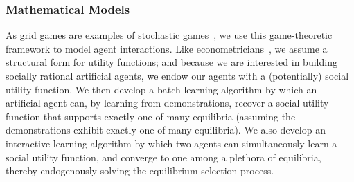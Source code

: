 
\subsubsection*{\large Mathematical Models}
\label{sec:models}

As grid games are examples of stochastic
games~\cite{Fink64,Shapley53}, we use this game-theoretic
framework to model agent interactions.
%
Like econometricians~\cite{RePEc:eee:ecochp:6a-64}, we assume a
structural form for utility functions; and because we are interested
in building socially rational artificial agents, we endow our agents
with a (potentially) social utility function.
%
We then develop a batch learning algorithm by which an artificial
agent can, by learning from demonstrations, recover a social utility
function that supports exactly one of many equilibria (assuming the
demonstrations exhibit exactly one of many equilibria).
%
We also develop an interactive learning algorithm by which two agents
can simultaneously learn a social utility function, and converge
to one among a plethora of equilibria, thereby endogenously solving
the equilibrium selection-process.







